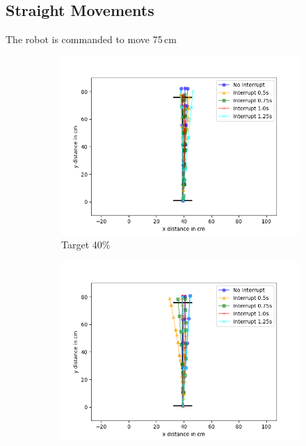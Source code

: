 \subsection{Straight Movements}

The robot is commanded to move 75\,cm

\begin{figure}
	\centering
	\begin{subfigure}[b]{0.62\textwidth}
		\includegraphics[width=\textwidth]{pics/straight_40.png}
		\caption{Target 40\%}
		\label{fig:stra_exp1}
	\end{subfigure}
	\begin{subfigure}[b]{0.62\textwidth}
		\includegraphics[width=\textwidth]{pics/straight_65.png}

\end{subfigure}
\end{figure}
